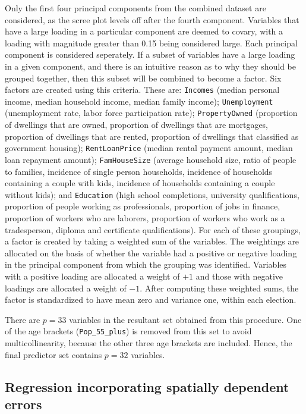 \documentclass[times, doublespace]{anzsauth}
\begin{document}
Only the first four principal components from the combined dataset are considered, as the scree plot levels off after the fourth component. Variables that have a large loading in a particular component are deemed to covary, with a loading with magnitude greater than 0.15 being considered large. Each principal component is considered seperately. If a subset of variables have a large loading in a given component, and there is an intuitive reason as to why they should be grouped together, then this subset will be combined to become a factor. Six factors are created using this criteria. These are:
\texttt{Incomes} (median personal income, median household income, median family income);
\texttt{Unemployment} (unemployment rate, labor force participation rate);
\texttt{PropertyOwned} (proportion of dwellings that are owned, proportion of dwellings that are mortgages, proportion of dwellings that are rented, proportion of dwellings that classified as government housing);
\texttt{RentLoanPrice} (median rental payment amount, median loan repayment amount);
\texttt{FamHouseSize} (average household size, ratio of people to families, incidence of single person households, incidence of households containing a couple with kids, incidence of households containing a couple without kids); and
\texttt{Education} (high school completions, university qualifications, proportion of people working as professionals, proportion of jobs in finance, proportion of workers who are laborers, proportion of workers who work as a tradesperson, diploma and certificate qualifications).
For each of these groupings, a factor is created by taking a weighted sum of the variables. The weightings are allocated on the basis of whether the variable had a positive or negative loading in the principal component from which the grouping was identified. Variables with a positive loading are allocated a weight of \(+1\) and those with negative loadings are allocated a weight of \(-1\). After computing these weighted sums, the factor is standardized to have mean zero and variance one, within each election.

There are \(p=33\) variables in the resultant set obtained from this procedure. One of the age brackets (\texttt{Pop\_55\_plus}) is removed from this set to avoid multicollinearity, because the other three age brackets are included. Hence, the final predictor set contains \(p=32\) variables.

\hypertarget{regression-incorporating-spatially-dependent-errors}{%
\subsection{Regression incorporating spatially dependent errors}\label{regression-incorporating-spatially-dependent-errors}}
\end{document}
